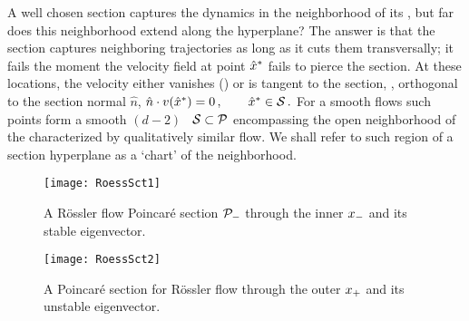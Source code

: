 A well chosen section captures the dynamics in the neighborhood of its
\template, but far does this neighborhood extend along the hyperplane?
The answer is that the section captures neighboring trajectories as long
as it cuts them transversally; it fails the moment the velocity field at
point $\hat{x}^\ast$ fails to pierce the section. At these locations, the
velocity either vanishes (\eqv) or is tangent to the section, \ie,
orthogonal to the section normal $\hat{n}$,
\(
    \hat{n} \cdot v(\hat{x}^\ast) = 0
\,,\qquad
    \hat{x}^\ast \in \cal{S}
\,.
\) %
For a smooth flows such points form a smooth $(d\!-\!2)$\dmn\ \emph{\poincBord} ${\cal S} \subset {\cal P}$
encompassing the open neighborhood of the {\template} characterized by
qualitatively similar flow. We shall refer to such region of a section hyperplane
as a `chart' of the {\template} neighborhood.


\begin{figure}%
\begin{center}
  \texttt{[image: RoessSct1]}
\end{center}
  \caption{\label{fig:RoessSct1}
  A R\"ossler flow Poincar\'e section ${\cal P}_{-}$ through the inner
  {\eqv} $x_{-}$ and its stable eigenvector.
}
\end{figure}

\begin{figure}%
\begin{center}
  \texttt{[image: RoessSct2]}
\end{center}
  \caption[R\"ossler section, outer {\eqv}]{
  A Poincar\'e section for R\"ossler flow
      through the
      outer
  {\eqv} $x_{+}$  and its unstable eigenvector.
  } \label{fig:RoessSct2}
\end{figure}

